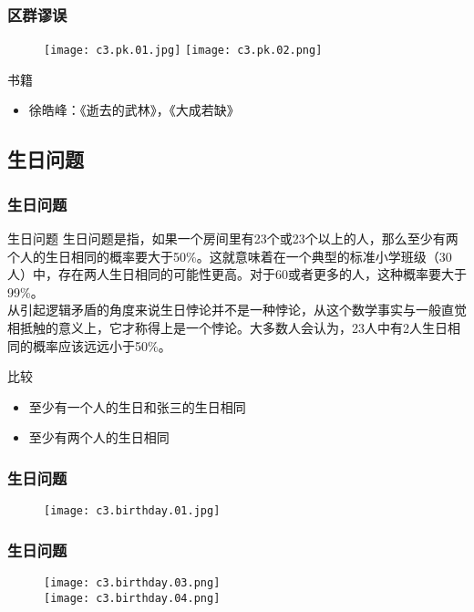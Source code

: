 \begin{frame}
  \frametitle{区群谬误}
  \begin{figure}
    \centering
    \texttt{[image: c3.pk.01.jpg]}\quad
    \texttt{[image: c3.pk.02.png]}
  \end{figure}
  \begin{block}{书籍}
    \begin{itemize}
      \item 徐皓峰：《逝去的武林》，《大成若缺》
    \end{itemize}
  \end{block}
\end{frame}

\subsection{生日问题}
\begin{frame}
  \frametitle{生日问题}
  \begin{block}{生日问题}
生日问题是指，如果一个房间里有23个或23个以上的人，那么至少有两个人的生日相同的概率要大于50\%。这就意味着在一个典型的标准小学班级（30人）中，存在两人生日相同的可能性更高。对于60或者更多的人，这种概率要大于99\%。\\
\vspace{0.3em}
从引起逻辑矛盾的角度来说生日悖论并不是一种悖论，从这个数学事实与一般直觉相抵触的意义上，它才称得上是一个悖论。大多数人会认为，23人中有2人生日相同的概率应该远远小于50\%。
  \end{block}
  \pause
  \begin{block}{比较}
    \begin{itemize}
      \item 至少有一个人的生日和张三的生日相同
      \item 至少有两个人的生日相同
    \end{itemize}
  \end{block}
\end{frame}

\begin{frame}
  \frametitle{生日问题}
  \begin{figure}
    \centering
    \texttt{[image: c3.birthday.01.jpg]}
  \end{figure}
\end{frame}

\begin{frame}
  \frametitle{生日问题}
  \begin{figure}
    \centering
    \texttt{[image: c3.birthday.03.png]}\\
    \texttt{[image: c3.birthday.04.png]}
  \end{figure}
\end{frame}

